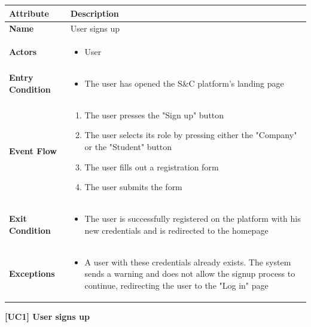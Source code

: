 \begin{center}
    
    \begin{tabular}{|p{3cm}|p{9cm}|}
    \hline
    \textbf{Attribute} & \textbf{Description} \\ \hline
    \textbf{Name} & User signs up \\ \hline
    \textbf{Actors} & 
    \begin{itemize}
        \item User
    \end{itemize} \\ \hline
    \textbf{Entry Condition} & 
    \begin{itemize}
        \item The user has opened the S\&C platform's landing page 
    \end{itemize} \\ \hline
    \textbf{Event Flow} & 
    \begin{enumerate}
        \item The user presses the "Sign up" button
        \item The user selects its role by pressing either the "Company" or the "Student" button
        \item The user fills out a registration form
        \item The user submits the form
    \end{enumerate} \\ \hline
    \textbf{Exit Condition} & 
    \begin{itemize}
        \item The user is successfully registered on the platform with his new credentials and is redirected to the homepage
    \end{itemize} \\ \hline
    \textbf{Exceptions} & 
    \begin{itemize}
        \item [5.] A user with these credentials already exists. The system sends a warning and does not allow the signup process to continue, redirecting the user to the "Log in" page
    \end{itemize} \\ \hline
    \end{tabular}
    \newline
    \newline
    \textbf{[UC1] User signs up}
    \newline
    \newline


\end{center}
